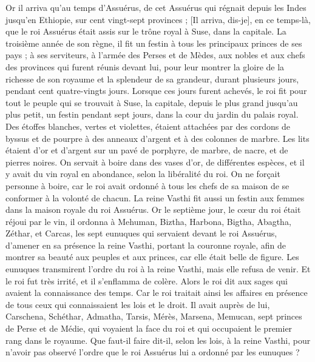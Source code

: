 \BFont
\begin{multicols}{2}
\VerseOne{}Or il arriva qu’au temps d’Assuérus, de cet Assuérus qui régnait depuis les Indes jusqu'en Ethiopie, sur cent vingt-sept provinces ;
[Il arriva, dis-je], en ce temps-là, que le roi Assuérus était assis sur le trône royal à Suse, dans la capitale.
La troisième année de son règne, il fit un festin à tous les principaux princes de ses pays ; à ses serviteurs, à l’armée des Perses et de Mèdes, aux nobles et aux chefs des provinces qui furent réunis devant lui,
pour leur montrer la gloire de la richesse de son royaume et la splendeur de sa grandeur, durant plusieurs jours, pendant cent quatre-vingts jours.
Lorsque ces jours furent achevés, le roi fit pour tout le peuple qui se trouvait à Suse, la capitale, depuis le plus grand jusqu'au plus petit, un festin pendant sept jours, dans la cour du jardin du palais royal.
Des étoffes blanches, vertes et violettes, étaient attachées par des cordons de byssus et de pourpre à des anneaux d'argent et à des colonnes de marbre. Les lits étaient d'or et d'argent sur un pavé de porphyre, de marbre, de nacre, et de pierres noires.
On servait à boire dans des vases d'or, de différentes espèces, et il y avait du vin royal en abondance, selon la libéralité du roi.
On ne forçait personne à boire, car le roi avait ordonné à tous les chefs de sa maison de se conformer à la volonté de chacun.
La reine Vasthi fit aussi un festin aux femmes dans la maison royale du roi Assuérus.
Or le septième jour, le cœur du roi était réjoui par le vin, il ordonna à Mehuman, Biztha, Harbona, Bigtha, Abagtha, Zéthar, et Carcas, les sept eunuques qui servaient devant le roi Assuérus,
d’amener en sa présence la reine Vasthi, portant la couronne royale, afin de montrer sa beauté aux peuples et aux princes, car elle était belle de figure.
Les eunuques transmirent l’ordre du roi à la reine Vasthi, mais elle refusa de venir. Et le roi fut très irrité, et il s’enflamma de colère.
Alors le roi dit aux sages qui avaient la connaissance des temps. Car le roi traitait ainsi les affaires en présence de tous ceux qui connaissaient les lois et le droit.
Il avait auprès de lui, Carschena, Schéthar, Admatha, Tarsis, Mérès, Marsena, Memucan, sept princes de Perse et de Médie, qui voyaient la face du roi et qui occupaient le premier rang dans le royaume.
Que faut-il faire dit-il, selon les lois, à la reine Vasthi, pour n'avoir pas observé l’ordre que le roi Assuérus lui a ordonné par les eunuques ?

\end{multicols}
